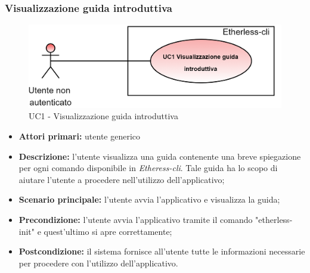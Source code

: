 \subsubsection{Visualizzazione guida introduttiva}
	\begin{figure}[h]
		\centering
		\includegraphics[scale=0.15]{./res/img/UC1-GuidaIntro.png}
		\caption {UC1 - Visualizzazione guida introduttiva}
	\end{figure}
	\begin{itemize}
		\item \textbf{Attori primari:} utente generico
		\item \textbf{Descrizione:} l'utente visualizza una guida contenente una breve spiegazione per ogni comando disponibile in \textit{Etheress-cli}. Tale guida ha lo scopo di aiutare l'utente a procedere nell'utilizzo dell'applicativo; 
		\item \textbf{Scenario principale:} l'utente avvia l'applicativo e visualizza la guida; 
		\item \textbf{Precondizione:} l'utente avvia l'applicativo tramite il comando "etherless-init" e quest'ultimo si apre correttamente; 
		\item \textbf{Postcondizione:} il sistema fornisce all'utente tutte le informazioni necessarie per procedere con l'utilizzo dell'applicativo. 
	\end{itemize}